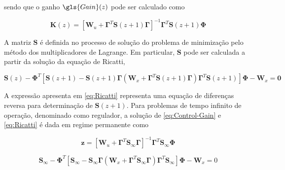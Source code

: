 \noindent sendo que o ganho $\gls{Gain}(z)$ pode ser calculado como

\begin{equation}\label{eq:Control-Gain}
    \boldsymbol{K}(z) = \left[ \boldsymbol{W}_{u} + \boldsymbol{\Gamma}^{T}\boldsymbol{S}(z+1)\boldsymbol{\Gamma} \right]^{-1}\boldsymbol{\Gamma}^{T}\boldsymbol{S}(z+1)\boldsymbol{\Phi}
\end{equation}

A matriz $\boldsymbol{S}$ é definida no processo de solução do problema de minimização pelo método dos multiplicadores de Lagrange. Em particular, $\boldsymbol{S}$ pode ser calculada a partir da solução da equação de Ricatti,

\begin{equation}\label{eq:Ricatti}
    \boldsymbol{S}(z) - \boldsymbol{\Phi}^{T} \left[ \boldsymbol{S}(z+1) - \boldsymbol{S}(z+1)\boldsymbol{\Gamma}\left( \boldsymbol{W}_{x} + \boldsymbol{\Gamma}^{T}\boldsymbol{S}(z+1)\boldsymbol{\Gamma} \right)\boldsymbol{\Gamma}^{T}\boldsymbol{S}(z+1) \right]\boldsymbol{\Phi} - \boldsymbol{W}_{x} = \boldsymbol{0}
\end{equation}

A expressão apresenta em \eqref{eq:Ricatti} representa uma equação de diferenças reversa para determinação de $\boldsymbol{S}(z+1)$. Para problemas de tempo infinito de operação, denominado como regulador, a solução de  \eqref{eq:Control-Gain} e \eqref{eq:Ricatti} é dada em regime permanente como

\begin{equation}\label{eq:cap3sec2:GainLQR}
    \boldsymbol{z} = \left[ \boldsymbol{W}_{u} + \boldsymbol{\Gamma}^{T}\boldsymbol{S}_{\infty}\boldsymbol{\Gamma} \right]^{-1}\boldsymbol{\Gamma}^{T}\boldsymbol{S}_{\infty}\boldsymbol{\Phi}
\end{equation}

\begin{equation}\label{eq:cap3sec2:RicattiLQR}
    \boldsymbol{S}_{\infty} - \boldsymbol{\Phi}^{T} \left[ \boldsymbol{S}_{\infty} - \boldsymbol{S}_{\infty}\boldsymbol{\Gamma}\left( \boldsymbol{W}_{x} + \boldsymbol{\Gamma}^{T}\boldsymbol{S}_{\infty}\boldsymbol{\Gamma} \right)\boldsymbol{\Gamma}^{T}\boldsymbol{S}_{\infty} \right]\boldsymbol{\Phi} - \boldsymbol{W}_{x} = 0
\end{equation}

